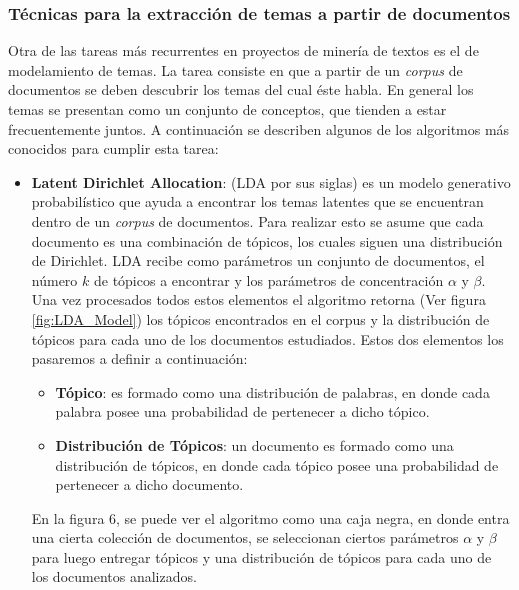 \subsubsection{Técnicas para la extracción de temas a partir de documentos}
    Otra de las tareas más recurrentes en proyectos de minería de textos es el de modelamiento de temas. La tarea consiste en que a partir de un \textit{corpus} de documentos se deben descubrir los temas del cual éste habla. En general los temas se presentan como un conjunto de conceptos, que tienden a estar frecuentemente juntos. A continuación se describen algunos de los algoritmos más conocidos para cumplir esta tarea:
    \begin{itemize}
\item \textbf{Latent Dirichlet Allocation}: \cite{blei2003latent} (LDA por sus siglas) es un modelo generativo probabilístico que ayuda a encontrar los temas latentes que se encuentran dentro de un \textit{corpus} de documentos. Para realizar esto se asume que cada documento es una combinación de tópicos, los cuales siguen una distribución de Dirichlet. LDA recibe como parámetros un conjunto de documentos, el número $k$ de tópicos a encontrar y los parámetros de concentración $\alpha$ y $\beta$. Una vez procesados todos estos elementos el algoritmo retorna (Ver figura \ref{fig:LDA_Model}) los tópicos encontrados en el corpus y la distribución de tópicos para cada uno de los documentos estudiados. Estos dos elementos los pasaremos a definir a continuación:
    
    \begin{itemize}
        \item \textbf{Tópico}: es formado como una distribución de palabras, en donde cada palabra posee una probabilidad de pertenecer a dicho tópico.
        \item \textbf{Distribución de Tópicos}: un documento es formado como una distribución de tópicos, en donde cada tópico posee una probabilidad de pertenecer a dicho documento.
    \end{itemize}
    
    En la figura 6, se puede ver el algoritmo como una caja negra, en donde entra una cierta colección de documentos, se seleccionan ciertos parámetros $\alpha$ y $\beta$ para luego entregar tópicos y una distribución de tópicos para cada uno de los documentos analizados.
    

\end{itemize}
